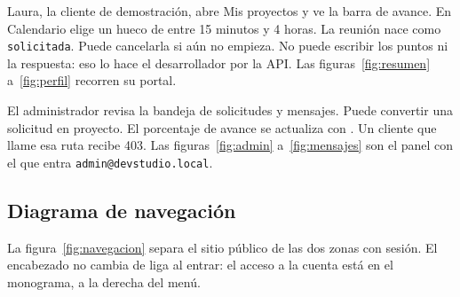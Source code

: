 
Laura, la cliente de demostración, abre Mis proyectos y ve la barra de avance.
En Calendario elige un hueco de entre 15 minutos y 4 horas. La reunión nace
como \texttt{solicitada}. Puede cancelarla si aún no empieza. No puede
escribir los puntos ni la respuesta: eso lo hace el desarrollador por la API.
Las figuras~\ref{fig:resumen} a~\ref{fig:perfil} recorren su portal.






El administrador revisa la bandeja de solicitudes y mensajes. Puede convertir
una solicitud en proyecto. El porcentaje de avance se actualiza con
. Un cliente que llame esa
ruta recibe 403. Las figuras~\ref{fig:admin} a~\ref{fig:mensajes} son el panel
con el que entra \texttt{admin@devstudio.local}.




\subsection{Diagrama de navegación}

La figura~\ref{fig:navegacion} separa el sitio público de las dos zonas con
sesión. El encabezado no cambia de liga al entrar: el acceso a la cuenta está
en el monograma, a la derecha del menú.

